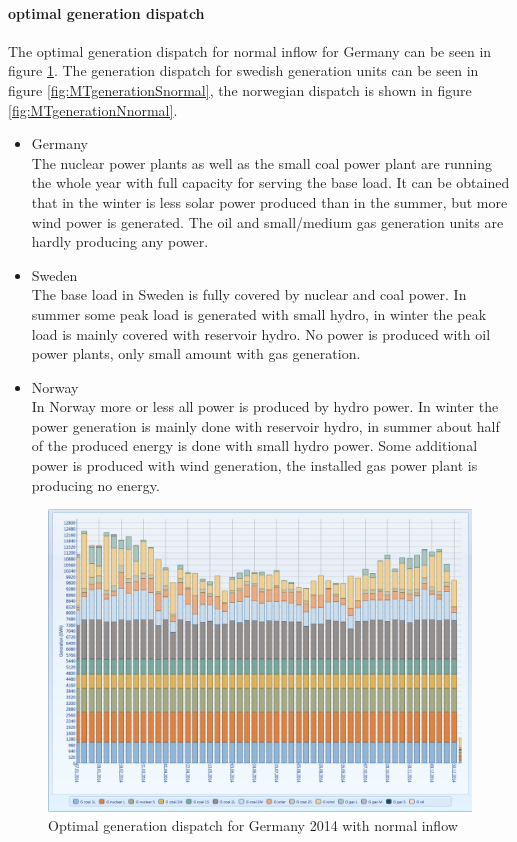 \documentclass{article}
\begin{document}
\paragraph{optimal generation dispatch\\}
The optimal generation dispatch for normal inflow for Germany can be seen in figure \ref{fig:MTgenerationGnormal}. The generation dispatch for swedish generation units can be seen in figure \ref{fig:MTgenerationSnormal}, the norwegian dispatch is shown in figure \ref{fig:MTgenerationNnormal}.
\begin{itemize}
\item Germany\\
The nuclear power plants as well as the small coal power plant are running the whole year with full capacity for serving the base load. It can be obtained that in the winter is less solar power produced than in the summer, but more wind power is generated. The oil and small/medium gas generation units are hardly producing any power.
\item Sweden\\
The base load in Sweden is fully covered by nuclear and coal power. In summer some peak load is generated with small hydro, in winter the peak load is mainly covered with reservoir hydro. No power is produced with oil power plants, only small amount with gas generation.
\item Norway\\
In Norway more or less all power is produced by hydro power. In winter the power generation is mainly done with reservoir hydro, in summer about half of the produced energy is done with small hydro power. Some additional power is produced with wind generation, the installed gas power plant is producing no energy.
\end{itemize}
\begin{figure}[htbp]
\begin{center}
\includegraphics[width=13cm,keepaspectratio=true]{figures/MTgenerationG}
\caption{Optimal generation dispatch for Germany 2014 with normal inflow}
\label{fig:MTgenerationGnormal}
\end{center}
\end{figure}
\end{document}
